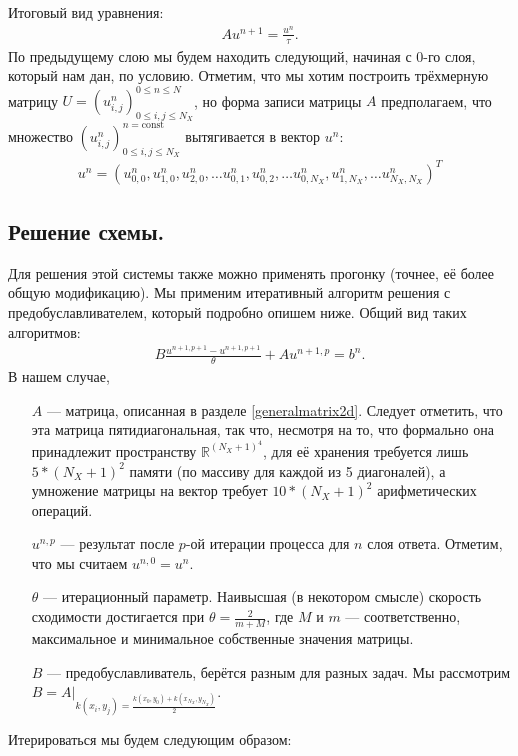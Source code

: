 \documentclass[14pt,a4paper]{extarticle}
\newcommand{\1}{\mathbbm{1}}
\newcommand{\R}{\mathbb{R}}
\begin{document}
Итоговый вид уравнения:
\begin{align*}
    A u^{n+1} = \frac{u^n}{\tau}. 
\end{align*}
По предыдущему слою мы будем находить следующий, начиная с 0-го слоя, который нам дан, по условию. Отметим, что мы хотим построить трёхмерную матрицу $U = (u^n_{i, j})^{0 \leq n \leq N} _{0 \leq i, j \leq N_X}$, но форма записи матрицы $A$ предполагаем, что множество $(u^n_{i, j})^{n=\text{const}} _{0 \leq i, j \leq N_X}$ вытягивается в вектор $u^{n}$:
    \begin{align*}
        u^n = (u^n_{0,0}, u^n_{1,0}, u^n_{2,0}, \ldots u^n_{0, 1}, u^n_{0, 2}, \ldots u^n_{0, N_X}, u^n_{1, N_X}, \ldots u^n_{N_X, N_X})^T
    \end{align*}
\subsection{Решение схемы.}
Для решения этой системы также можно применять прогонку (точнее, её более общую модификацию). Мы применим итеративный алгоритм решения с предобуславливателем, который подробно опишем ниже. Общий вид таких алгоритмов:
\begin{align*}
    B \frac{u^{n+1, p+1} - u^{n+1, p+1}}{\theta} + A u^{n+1, p} = b^n.
\end{align*}
В нашем случае, 
\begin{enumerate}
    \item[$A$] --- матрица, описанная в разделе \ref{generalmatrix2d}. Следует отметить, что эта матрица пятидиагональная, так что, несмотря на то, что формально она принадлежит пространству $\R ^{(N_X+1)^4}$, для её хранения требуется лишь $5 * (N_X+1)^2$ памяти (по массиву для каждой из 5 диагоналей), а умножение матрицы на вектор требует $10 * (N_X+1)^2$ арифметических операций.
    \item[$u^{n, p}$] --- результат после $p$-ой итерации процесса для $n$ слоя ответа. Отметим, что мы считаем $u^{n, 0} = u^n$.
    \item[$\theta$] --- итерационный параметр. Наивысшая (в некотором смысле) скорость сходимости достигается при $\theta = \frac{2}{m + M}$, где $M$ и $m$ --- соответственно, максимальное и минимальное собственные значения матрицы. 
    \item[$B$] --- предобуславливатель, берётся разным для разных задач. Мы рассмотрим $B = A \big|_{k(x_i, y_j) = \frac{k(x_0, y_0)+k(x_{N_X}, y_{N_X})}{2}}$.
\end{enumerate}
Итерироваться мы будем следующим образом:
\end{document}
